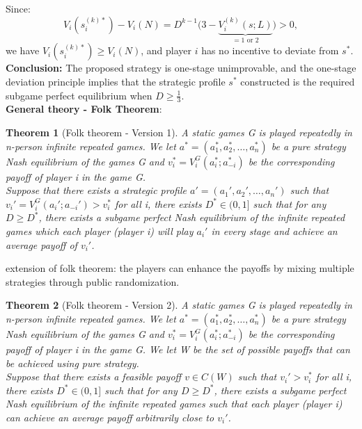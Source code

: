 \documentclass[twoside]{article}
\theoremstyle{definitionstyle}
\newtheorem*{theorem}{Theorem}
\begin{document}
Since:
\[
V_i(s_i^{(k)*}) - V_i(N) = D^{k-1}\Big(3 - \underbrace{V_i^{(k)}(s; L)}_{=1 \text{ or } 2}\Big) > 0,
\]
we have $V_i(s_i^{(k)*}) \ge V_i(N)$, and player $i$ has no incentive to deviate from $s^*$.\\
\textbf{Conclusion:}
The proposed strategy is one-stage unimprovable, and the one-stage deviation principle implies that the strategic profile $s^*$ constructed is the required subgame perfect equilibrium when $D \ge \frac{1}{3}$.\\
%
%
%
%
%
\textbf{General theory - Folk Theorem}:\\
\begin{theorem}[Folk theorem - Version 1]
  A static games G is played repeatedly in n-person infinite repeated games. We let $a^* = (a_1^*, a_2^*, \ldots, a_n^*)$ be a pure strategy Nash equilibrium of the games G and $v_i^* = V_i^G(a_i^*; a_{-i}^*)$ be the corresponding payoff of player i in the game G.  \\
Suppose that there exists a strategic profile $a' =( a_1', a_2', \ldots, a_n')$ such that $v_i' = V_i^G(a_i';a_{-i}')>v_i^*$ for all i, there exists $D^* \in (0, 1]$ such that for any $D \geq D^*$, there exists a subgame perfect Nash equilibrium of the infinite repeated games which each player (player i) will play $a_i'$ in every stage and achieve an average payoff of $v_i'$. 
\end{theorem}
extension of folk theorem:  the players can enhance the payoffs by mixing multiple strategies through public randomization. \\
%
%
%
\begin{theorem}[Folk theorem - Version 2]
  A static games G is played repeatedly in n-person infinite repeated games. We let $a^* = (a_1^*, a_2^*, \ldots, a_n^*)$ be a pure strategy Nash equilibrium of the games G and $v_i^* = V_i^G(a_i^*; a_{-i}^*)$ be the corresponding payoff of player i in the game G.  We let W be the set of possible payoffs that can be achieved using pure strategy. \\
Suppose that there exists a feasible payoff $v\in C(W)$ such that $v_i' > v_i^*$ for all i, there exists $D^* \in (0, 1]$ such that for any $D \geq D^*$, there exists a subgame perfect Nash equilibrium of the infinite repeated games such that each player (player i) can achieve an average payoff arbitrarily close to $v_i'$. 
\end{theorem}
%
%
%
%
%
\end{document}
